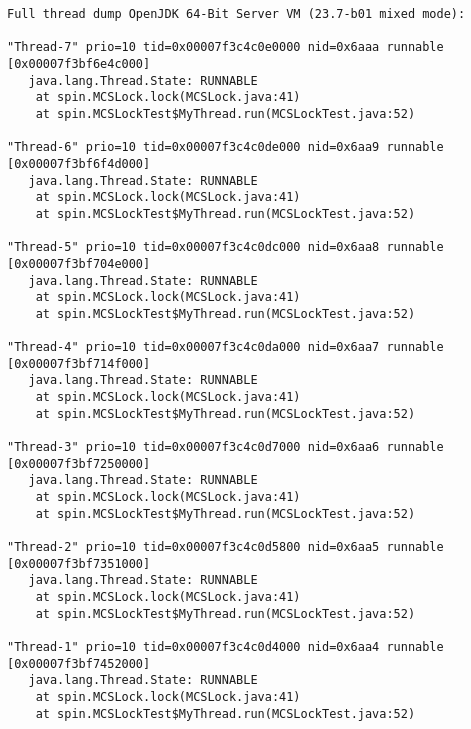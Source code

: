 \begin{verbatim}
Full thread dump OpenJDK 64-Bit Server VM (23.7-b01 mixed mode):

"Thread-7" prio=10 tid=0x00007f3c4c0e0000 nid=0x6aaa runnable [0x00007f3bf6e4c000]
   java.lang.Thread.State: RUNNABLE
	at spin.MCSLock.lock(MCSLock.java:41)
	at spin.MCSLockTest$MyThread.run(MCSLockTest.java:52)

"Thread-6" prio=10 tid=0x00007f3c4c0de000 nid=0x6aa9 runnable [0x00007f3bf6f4d000]
   java.lang.Thread.State: RUNNABLE
	at spin.MCSLock.lock(MCSLock.java:41)
	at spin.MCSLockTest$MyThread.run(MCSLockTest.java:52)

"Thread-5" prio=10 tid=0x00007f3c4c0dc000 nid=0x6aa8 runnable [0x00007f3bf704e000]
   java.lang.Thread.State: RUNNABLE
	at spin.MCSLock.lock(MCSLock.java:41)
	at spin.MCSLockTest$MyThread.run(MCSLockTest.java:52)

"Thread-4" prio=10 tid=0x00007f3c4c0da000 nid=0x6aa7 runnable [0x00007f3bf714f000]
   java.lang.Thread.State: RUNNABLE
	at spin.MCSLock.lock(MCSLock.java:41)
	at spin.MCSLockTest$MyThread.run(MCSLockTest.java:52)

"Thread-3" prio=10 tid=0x00007f3c4c0d7000 nid=0x6aa6 runnable [0x00007f3bf7250000]
   java.lang.Thread.State: RUNNABLE
	at spin.MCSLock.lock(MCSLock.java:41)
	at spin.MCSLockTest$MyThread.run(MCSLockTest.java:52)

"Thread-2" prio=10 tid=0x00007f3c4c0d5800 nid=0x6aa5 runnable [0x00007f3bf7351000]
   java.lang.Thread.State: RUNNABLE
	at spin.MCSLock.lock(MCSLock.java:41)
	at spin.MCSLockTest$MyThread.run(MCSLockTest.java:52)

"Thread-1" prio=10 tid=0x00007f3c4c0d4000 nid=0x6aa4 runnable [0x00007f3bf7452000]
   java.lang.Thread.State: RUNNABLE
	at spin.MCSLock.lock(MCSLock.java:41)
	at spin.MCSLockTest$MyThread.run(MCSLockTest.java:52)


\end{verbatim}
